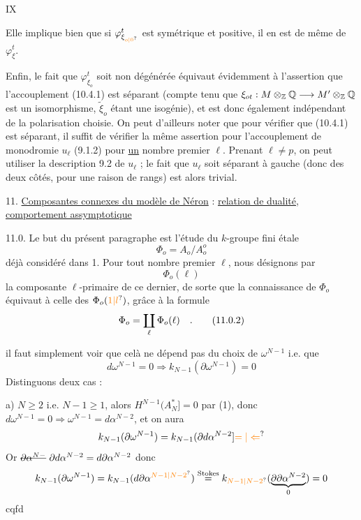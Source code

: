 \hfill IX

Elle implique bien que si $\varphi^t_{\xi_{\unsure{o|0}}}$ est symétrique et positive, il en est de même de $\varphi^t_\xi$.

Enfin, le fait que $\varphi^t_{\xi_o}$ soit non dégénérée équivaut évidemment à l'assertion que l'accouplement (10.4.1) est séparant (compte tenu que $\xi_{ot}:M\otimes_{\mathbb{Z}}\mathbb{Q}\longrightarrow M'\otimes_{\mathbb{Z}}\mathbb{Q}$ est un isomorphisme, $\widetilde{\xi}_o$ étant une isogénie), et est donc également indépendant de la polarisation choisie. On peut d'ailleurs noter que pour vérifier que (10.4.1) est séparant, il suffit de vérifier la même assertion pour l'accouplement de monodromie $u_\ell$ (9.1.2) pour \uline{un} nombre premier $\ell$. Prenant $\ell\ne p$, on peut utiliser la description 9.2 de $u_\ell$ ; le fait que $u_\ell$ soit séparant à gauche (donc des deux côtés, pour une raison de rangs) est alors trivial.

11. \uline{Composantes connexes du modèle de Néron} : \uline{relation de dualité}, \uline{comportement assymptotique}

11.0. Le but du présent paragraphe est l'étude du $k$-groupe fini étale
\[
 \Phi_o=A_o/A_o^o\tag*{(11.0.1)}
\]
déjà considéré dans 1. Pour tout nombre premier $\ell$, nous désignons par
\[
 \Phi_o(\ell)
\]
la composante $\ell$-primaire de ce dernier, de sorte que la connaissance de $\Phi_o$ équivaut à celle des $\Phi_o(\unsure{1|l})$, grâce à la formule
\[
 \Phi_o=\coprod_{\ell}\Phi_o(\ell)\quad .\tag*{(11.0.2)}
\]

il faut simplement voir que celà ne dépend pas du choix de $\omega^{N-1}$ i.e. que 
\[
 d\omega^{N-1}=0\Longrightarrow k_{N-1}(\partial\omega^{N-1})=0
\]
Distinguons deux cas :

a) $N\geq2$ i.e. $N-1\geq1$, alors $H^{N-1}(A_N^*]=0$ par (1), donc $d\omega^{N-1}=0\Rightarrow\omega^{N-1}=d\alpha^{N-2}$, et on aura
\[
 k_{N-1}(\partial\omega^{N-1})=k_{N-1}(\partial d\alpha^{N-2}]\unsure{=|\Leftarrow}
\]
Or $\deleted{\partial\alpha^{N-}}\ \partial d\alpha^{N-2}=d\partial\alpha^{N-2}$ donc 
\[
 k_{N-1}(\partial\omega^{N-1})=k_{N-1}(d\partial\alpha^{\unsure{N-1|N-2}})
 \overset{\text{Stokes}}{=}k_{\unsure{N-1|N-2}}(\underbrace{\partial\partial\alpha^{N-2}}_0)=0
\]
cqfd

